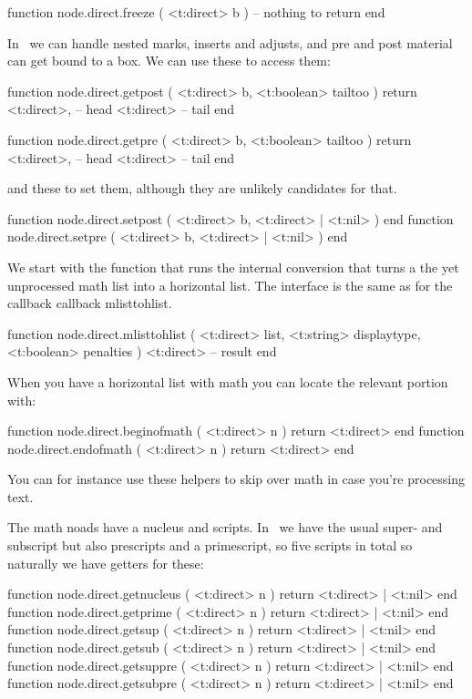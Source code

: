 \starttyping[option=LUA]
function node.direct.freeze ( <t:direct> b )
    -- nothing to return
end
\stoptyping

In \LUAMETATEX\ we can handle nested marks, inserts and adjusts, and
pre and post material can get bound to a box. We can use these to access them:

\starttyping[option=LUA]
function node.direct.getpost ( <t:direct> b, <t:boolean> tailtoo )
    return
        <t:direct>, -- head
        <t:direct>  -- tail
end

function node.direct.getpre ( <t:direct> b, <t:boolean> tailtoo )
    return
        <t:direct>, -- head
        <t:direct>  -- tail
end
\stoptyping

and these to set them, although they are unlikely candidates for that.

\starttyping[option=LUA]
function node.direct.setpost ( <t:direct> b, <t:direct> | <t:nil> ) end
function node.direct.setpre  ( <t:direct> b, <t:direct> | <t:nil> ) end
\stoptyping

\stopsubsection

\startsubsection[title={Math}]

We start with the function that runs the internal 
conversion that turns a the yet unprocessed math list into a horizontal list. The
interface is the same as for the callback callback {mlisttohlist}.

\starttyping[option=LUA]
function node.direct.mlisttohlist (
    <t:direct>  list,
    <t:string>  displaytype,
    <t:boolean> penalties
)
   <t:direct> -- result
end
\stoptyping

When you have a horizontal list with math you can locate the relevant portion
with:

\starttyping[option=LUA]
function node.direct.beginofmath ( <t:direct> n ) return <t:direct> end
function node.direct.endofmath   ( <t:direct> n ) return <t:direct> end
\stoptyping

You can for instance use these helpers to skip over math in case you're
processing text.

The math noads have a nucleus and scripts. In \LUAMETATEX\ we have the usual
super- and subscript but also prescripts and a primescript, so five scripts in
total so naturally we have getters for these:

\starttyping[option=LUA]
function node.direct.getnucleus ( <t:direct> n ) return <t:direct> | <t:nil> end
function node.direct.getprime   ( <t:direct> n ) return <t:direct> | <t:nil> end
function node.direct.getsup     ( <t:direct> n ) return <t:direct> | <t:nil> end
function node.direct.getsub     ( <t:direct> n ) return <t:direct> | <t:nil> end
function node.direct.getsuppre  ( <t:direct> n ) return <t:direct> | <t:nil> end
function node.direct.getsubpre  ( <t:direct> n ) return <t:direct> | <t:nil> end
\stoptyping

